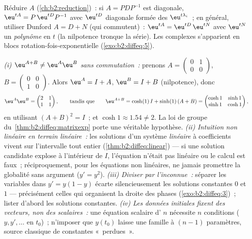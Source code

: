\begin{method}[Calcul de $\eu^{tA}$]\label{met:b2:diffeq:computeexp}
Réduire $A$ (\cref{ch:b2:reduction})~: si $A = PDP^{-1}$ est
diagonale, $\eu^{tA} = P\,\eu^{tD}P^{-1}$ avec $\eu^{tD}$ diagonale
formée des $\eu^{t\lambda_i}$~; en général, utiliser Dunford $A = D
+ N$ (qui commutent)~: $\eu^{tA} = \eu^{tD}\,\eu^{tN}$ avec
$\eu^{tN}$ un \emph{polynôme} en $t$ (la nilpotence tronque la
série). Les  complexes s'apparient en blocs
rotation-fois-exponentielle (\cref{exo:b2:diffeq:5}).
\end{method}

\begin{remark}
\emph{(i) $\eu^{A+B} \neq \eu^A\eu^B$ sans commutation~:}
prenons $A = \begin{pmatrix} 0 & 1\\ 0 & 0\end{pmatrix}$, $B =
\begin{pmatrix} 0 & 0\\ 1 & 0\end{pmatrix}$. Alors $\eu^A = I +
A$, $\eu^B = I + B$ (nilpotence), donc
\[
\eu^A\eu^B = \begin{pmatrix} 2 & 1\\ 1 & 1\end{pmatrix},
\qquad\text{tandis que}\qquad
\eu^{A+B} = \cosh(1)\,I + \sinh(1)\,(A + B)
= \begin{pmatrix} \cosh 1 & \sinh 1\\ \sinh 1 & \cosh 1
\end{pmatrix},
\]
en utilisant $(A+B)^2 = I$~; et $\cosh 1 \approx 1.54 \neq 2$. La
loi de groupe du~\cref{thm:b2:diffeq:matrixexp} porte une
véritable hypothèse. \emph{(ii) Intuition non linéaire en terrain
linéaire~:} les solutions d'un système \emph{linéaire} à
coefficients  vivent sur l'intervalle tout entier
(\cref{thm:b2:diffeq:linear}) --- si une solution candidate
explose à l'intérieur de $I$, l'équation n'était pas linéaire ou
le calcul est faux~; réciproquement, pour les équations non
linéaires, ne jamais promettre la globalité sans argument ($y' =
y^2$). \emph{(iii) Diviser par l'inconnue~:} séparer les variables
dans $y' = y(1-y)$ écarte silencieusement les solutions constantes
$0$ et $1$ --- précisément celles qui organisent la droite des
phases (\cref{exo:b2:diffeq:3})~; lister d'abord les solutions
constantes. \emph{(iv) Les données initiales fixent des vecteurs,
non des scalaires~:} une équation scalaire d' $n$ nécessite
$n$ conditions ($y, y', \dots$ en $t_0$)~; n'imposer que $y(t_0)$
laisse une famille à $(n-1)$ paramètres, source classique de
constantes «~perdues~».
\end{remark}

